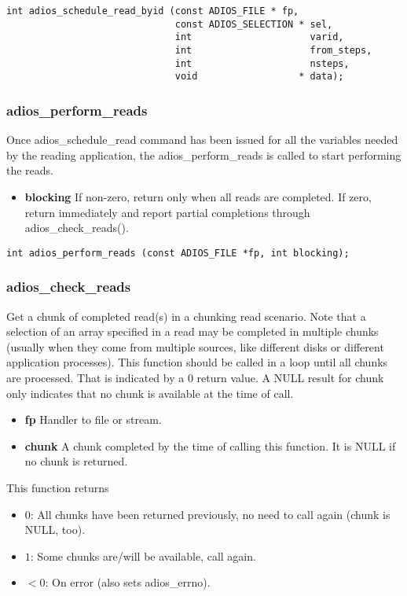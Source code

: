 \begin{lstlisting}[language=ADIOS]
int adios_schedule_read_byid (const ADIOS_FILE * fp, 
                              const ADIOS_SELECTION * sel,
                              int                     varid,
                              int                     from_steps,
                              int                     nsteps,
                              void                  * data);
\end{lstlisting}

\subsubsection*{adios\_perform\_reads}
Once adios\_schedule\_read command has been issued for all the variables needed by the reading application, the adios\_perform\_reads 
is called to start performing the reads. 
\begin{itemize}
\item{\bf blocking} If non-zero, return only when all reads are completed.
If zero, return immediately and report partial completions
through adios\_check\_reads(). 
\end{itemize}

\begin{lstlisting}[language=ADIOS]
int adios_perform_reads (const ADIOS_FILE *fp, int blocking);
\end{lstlisting}

\subsubsection*{adios\_check\_reads}
Get a chunk of completed read(s) in a chunking read scenario.
Note that a selection of an array specified in a read may be completed in
multiple chunks (usually when they come from multiple sources, like
different disks or different application processes). 
This function should be called in a loop until all chunks are processed. 
That is indicated by a 0 return value. A NULL result for chunk only
indicates that no chunk is available at the time of call. 

\begin{itemize}
\item{\bf fp} Handler to file or stream.
\item{\bf chunk} A chunk completed by the time of calling this function.
It is NULL if no chunk is returned.
\end{itemize}
This function returns 
\begin{itemize}
\item $0$: All chunks have been returned previously, 
                no need to call again (chunk is NULL, too).
\item $1$: Some chunks are/will be available, call again. 
\item $<0$: On error (also sets adios\_errno).
\end{itemize}

